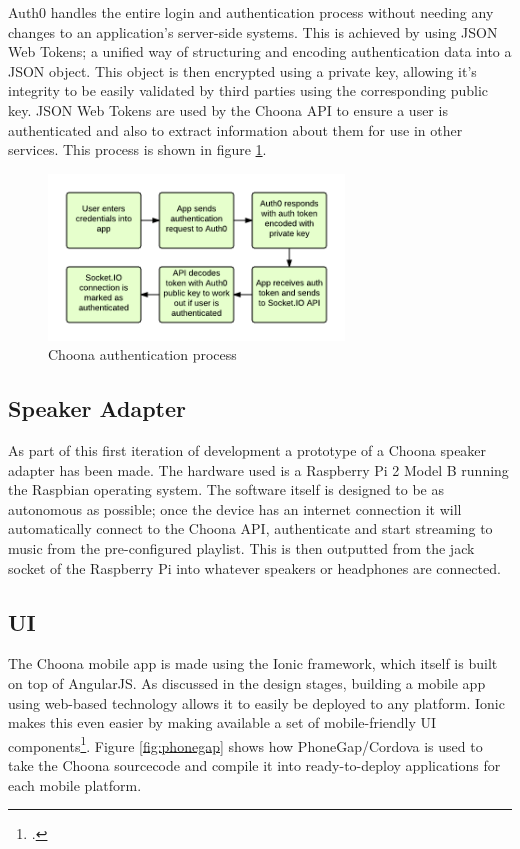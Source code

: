 Auth0 handles the entire login and authentication process without needing any changes to an application's server-side systems. This is achieved by using JSON Web Tokens; a unified way of structuring and encoding authentication data into a JSON object. This object is then encrypted using a private key, allowing it's integrity to be easily validated by third parties using the corresponding public key. JSON Web Tokens are used by the Choona API to ensure a user is authenticated and also to extract information about them for use in other services. This process is shown in figure \ref{fig:auth-process}.

\begin{figure}[h!]
  \centering
  \includegraphics[width=0.7\textwidth]{./img/auth-process.png}
  \caption{Choona authentication process}
  \label{fig:auth-process}
\end{figure}


\subsection{Speaker Adapter}

As part of this first iteration of development a prototype of a Choona speaker adapter has been made. The hardware used is a Raspberry Pi 2 Model B running the Raspbian operating system. The software itself is designed to be as autonomous as possible; once the device has an internet connection it will automatically connect to the Choona API, authenticate and start streaming to music from the pre-configured playlist. This is then outputted from the jack socket of the Raspberry Pi into whatever speakers or headphones are connected.


\subsection{UI}

The Choona mobile app is made using the Ionic framework, which itself is built on top of AngularJS. As discussed in the design stages, building a mobile app using web-based technology allows it to easily be deployed to any platform. Ionic makes this even easier by making available a set of mobile-friendly UI components\footcite{ionic}. Figure \ref{fig:phonegap} shows how PhoneGap/Cordova is used to take the Choona sourcecode and compile it into ready-to-deploy applications for each mobile platform.

